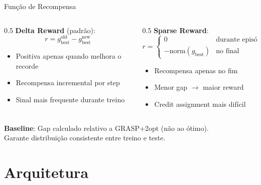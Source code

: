 \documentclass[11pt, xcolor=dvipsnames]{beamer}
\begin{document}
\begin{frame}{Função de Recompensa}
  \footnotesize
  \begin{columns}[T]
    \begin{column}{0.5\textwidth}
      \textbf{Delta Reward} (padrão):
      \[
        r = g_{\text{best}}^{\text{old}} - g_{\text{best}}^{\text{new}}
      \]
      \begin{itemize}
        \item Positiva apenas quando melhora o recorde
        \item Recompensa incremental por step
        \item Sinal mais frequente durante treino
      \end{itemize}
    \end{column}
    \begin{column}{0.5\textwidth}
      \textbf{Sparse Reward}:
      \[
        r = \begin{cases}
          0 & \text{durante episódio} \\
          -\text{norm}(g_{\text{best}}) & \text{no final}
        \end{cases}
      \]
      \begin{itemize}
        \item Recompensa apenas no fim
        \item Menor gap $\rightarrow$ maior reward
        \item Credit assignment mais difícil
      \end{itemize}
    \end{column}
  \end{columns}
  \vspace{3mm}
  \begin{calloutbox}
    {\scriptsize
    \textbf{Baseline}: Gap calculado relativo a GRASP+2opt (não ao ótimo). \\
    Garante distribuição consistente entre treino e teste.
    }
  \end{calloutbox}
\end{frame}

\section{Arquitetura}
\end{document}
